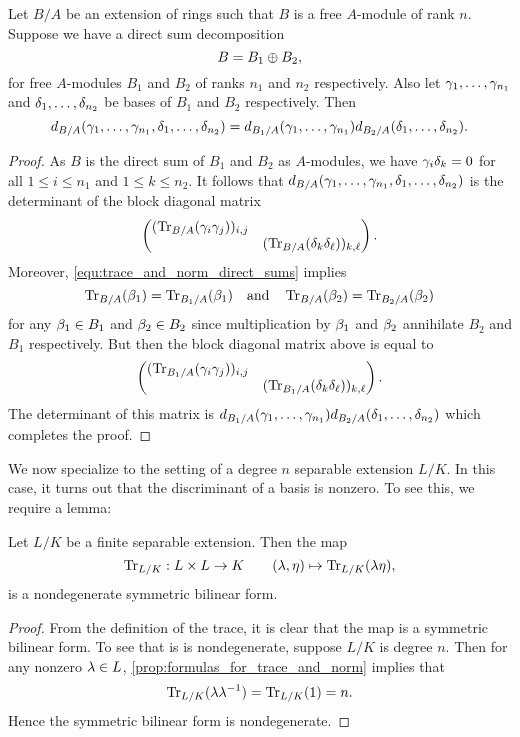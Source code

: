    \begin{proposition}\label{prop:discriminant_and_direct_sums}
      Let $B/A$ be an extension of rings such that $B$ is a free $A$-module of rank $n$. Suppose we have a direct sum decomposition
      \[
        B = B_{1} \oplus B_{2},
      \]
      for free $A$-modules $B_{1}$ and $B_{2}$ of ranks $n_{1}$ and $n_{2}$ respectively. Also let $\gamma_{1},\ldots,\gamma_{n_{1}}$ and $\delta_{1},\ldots,\delta_{n_{2}}$ be bases of $B_{1}$ and $B_{2}$ respectively. Then
      \[
        d_{B/A}(\gamma_{1},\ldots,\gamma_{n_{1}},\delta_{1},\ldots,\delta_{n_{2}}) = d_{B_{1}/A}(\gamma_{1},\ldots,\gamma_{n_{1}})d_{B_{2}/A}(\delta_{1},\ldots,\delta_{n_{2}}).
      \]
    \end{proposition}
    \begin{proof}
      As $B$ is the direct sum of $B_{1}$ and $B_{2}$ as $A$-modules, we have $\gamma_{i}\delta_{k} = 0$ for all $1 \le i \le n_{1}$ and $1 \le k \le n_{2}$. It follows that $d_{B/A}(\gamma_{1},\ldots,\gamma_{n_{1}},\delta_{1},\ldots,\delta_{n_{2}})$ is the determinant of the block diagonal matrix
      \[
        \begin{pmatrix} (\operatorname{\mathrm{Tr}}_{B/A}(\gamma_{i}\gamma_{j}))_{i,j} & \\ & (\operatorname{\mathrm{Tr}}_{B/A}(\delta_{k}\delta_{\ell}))_{k,\ell} \end{pmatrix}.
      \]
      Moreover, \cref{equ:trace_and_norm_direct_sums} implies
      \[
        \operatorname{\mathrm{Tr}}_{B/A}(\beta_{1}) = \operatorname{\mathrm{Tr}}_{B_{1}/A}(\beta_{1}) \quad \text{and} \quad \operatorname{\mathrm{Tr}}_{B/A}(\beta_{2}) = \operatorname{\mathrm{Tr}}_{B_{2}/A}(\beta_{2})
      \]
      for any $\beta_{1} \in B_{1}$ and $\beta_{2} \in B_{2}$ since multiplication by $\beta_{1}$ and $\beta_{2}$ annihilate $B_{2}$ and $B_{1}$ respectively. But then the block diagonal matrix above is equal to
      \[
        \begin{pmatrix} (\operatorname{\mathrm{Tr}}_{B_{1}/A}(\gamma_{i}\gamma_{j}))_{i,j} & \\ & (\operatorname{\mathrm{Tr}}_{B_{1}/A}(\delta_{k}\delta_{\ell}))_{k,\ell} \end{pmatrix}.
      \]
      The determinant of this matrix is $d_{B_{1}/A}(\gamma_{1},\ldots,\gamma_{n_{1}})d_{B_{2}/A}(\delta_{1},\ldots,\delta_{n_{2}})$ which completes the proof.
    \end{proof}
    
    We now specialize to the setting of a degree $n$ separable extension $L/K$. In this case, it turns out that the discriminant of a basis is nonzero. To see this, we require a lemma:

    \begin{lemma}\label{lem:trace_is_nondegenerate}
      Let $L/K$ be a finite separable extension. Then the map
      \[
        \operatorname{\mathrm{Tr}}_{L/K}:L \times L \to K \qquad (\lambda,\eta) \mapsto \operatorname{\mathrm{Tr}}_{L/K}(\lambda\eta),
      \]
      is a nondegenerate symmetric bilinear form.
    \end{lemma}
    \begin{proof}
      From the definition of the trace, it is clear that the map is a symmetric bilinear form. To see that is is nondegenerate, suppose $L/K$ is degree $n$. Then for any nonzero $\lambda \in L$, \cref{prop:formulas_for_trace_and_norm} implies that
      \[
        \operatorname{\mathrm{Tr}}_{L/K}(\lambda\lambda^{-1}) = \operatorname{\mathrm{Tr}}_{L/K}(1) = n.
      \]
      Hence the symmetric bilinear form is nondegenerate.
    \end{proof}

